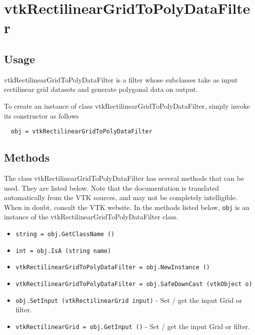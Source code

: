 \section{vtkRectilinearGridToPolyDataFilter}

\subsection{Usage}

 vtkRectilinearGridToPolyDataFilter is a filter whose subclasses take as
 input rectilinear grid datasets and generate polygonal data on output.

To create an instance of class vtkRectilinearGridToPolyDataFilter, simply
invoke its constructor as follows
\begin{verbatim}
  obj = vtkRectilinearGridToPolyDataFilter
\end{verbatim}
\subsection{Methods}

The class vtkRectilinearGridToPolyDataFilter has several methods that can be used.
  They are listed below.
Note that the documentation is translated automatically from the VTK sources,
and may not be completely intelligible.  When in doubt, consult the VTK website.
In the methods listed below, \verb|obj| is an instance of the vtkRectilinearGridToPolyDataFilter class.
\begin{itemize}
\item  \verb|string = obj.GetClassName ()|

\item  \verb|int = obj.IsA (string name)|

\item  \verb|vtkRectilinearGridToPolyDataFilter = obj.NewInstance ()|

\item  \verb|vtkRectilinearGridToPolyDataFilter = obj.SafeDownCast (vtkObject o)|

\item  \verb|obj.SetInput (vtkRectilinearGrid input)| -  Set / get the input Grid or filter.

\item  \verb|vtkRectilinearGrid = obj.GetInput ()| -  Set / get the input Grid or filter.

\end{itemize}
